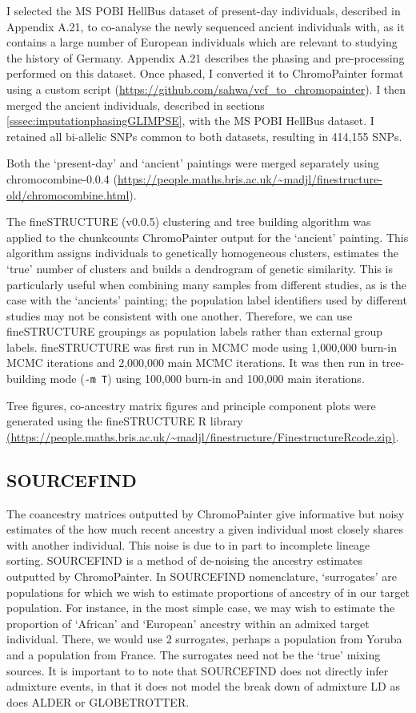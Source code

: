 I selected the MS POBI HellBus dataset of present-day individuals, described in Appendix A.21, to co-analyse the newly sequenced ancient individuals with, as it contains a large number of European individuals which are relevant to studying the history of Germany. Appendix A.21 describes the phasing and pre-processing performed on this dataset. Once phased, I converted it to ChromoPainter format using a custom script (\url{https://github.com/sahwa/vcf_to_chromopainter}). I then merged the ancient individuals, described in sections \ref{sssec:imputationphasingGLIMPSE}, with the MS POBI HellBus dataset. I retained all bi-allelic SNPs common to both datasets, resulting in 414,155 SNPs.

Both the `present-day' and `ancient' paintings were merged separately using chromocombine-0.0.4 (\url{https://people.maths.bris.ac.uk/~madjl/finestructure-old/chromocombine.html}). 

The fineSTRUCTURE (v0.0.5)\cite{Lawson2012} clustering and tree building algorithm was applied to the chunkcounts ChromoPainter output for the `ancient' painting. This algorithm assigns individuals to genetically homogeneous clusters, estimates the `true' number of clusters and builds a dendrogram of genetic similarity. This is particularly useful when combining many samples from different studies, as is the case with the `ancients' painting; the population label identifiers used by different studies may not be consistent with one another. Therefore, we can use fineSTRUCTURE groupings as population labels rather than external group labels. fineSTRUCTURE was first run in MCMC mode using 1,000,000 burn-in MCMC iterations and 2,000,000 main MCMC iterations. It was then run in tree-building mode (\texttt{-m T}) using 100,000 burn-in and 100,000 main iterations. 

Tree figures, co-ancestry matrix figures and principle component plots were generated using the fineSTRUCTURE R library \url{(https://people.maths.bris.ac.uk/~madjl/finestructure/FinestructureRcode.zip)}.

\subsection{SOURCEFIND}

The coancestry matrices outputted by ChromoPainter give informative but noisy estimates of the how much recent ancestry a given individual most closely shares with another individual. This noise is due to in part to incomplete lineage sorting. SOURCEFIND \cite{Chacon-Duque2018} is a method of de-noising the ancestry estimates outputted by ChromoPainter. In SOURCEFIND nomenclature, `surrogates' are populations for which we wish to estimate proportions of ancestry of in our target population. For instance, in the most simple case, we may wish to estimate the proportion of `African' and `European' ancestry within an admixed target individual. There, we would use 2 surrogates, perhaps a population from Yoruba and a population from France. The surrogates need not be the `true' mixing sources. It is important to to note that SOURCEFIND does not directly infer admixture events, in that it does not model the break down of admixture LD as does ALDER or GLOBETROTTER. 

